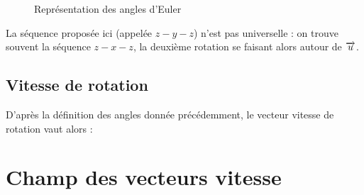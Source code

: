 \begin{figure}[htbp]
	\centering
	
	\caption{Représentation des angles d'Euler}
	\label{fig:euler}
\end{figure}

\begin{note}
La séquence proposée ici (appelée $z-y-z$) n'est pas universelle : on trouve souvent la séquence $z-x-z$, la deuxième rotation se faisant alors autour de $\overrightarrow{u}$.
\end{note}

	\subsection{Vitesse de rotation}
	D'après la définition des angles donnée précédemment, le vecteur vitesse de rotation vaut alors :

\section{Champ des vecteurs vitesse} 
